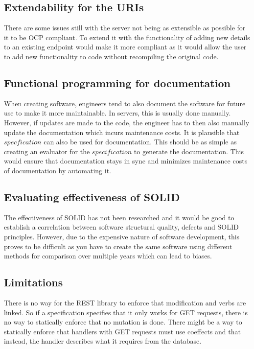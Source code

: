 \subsection{Extendability for the URIs}

There are some issues still with the server not being as extensible as possible
for it to be OCP compliant. To extend it with the functionality of adding new
details to an existing endpoint would make it more compliant as it would allow
the user to add new functionality to code without recompiling the original
code. 

\subsection{Functional programming for documentation}

When creating software, engineers tend to also document the software for future
use to make it more maintainable. In servers, this is usually done manually.
However, if updates are made to the code, the engineer has to then also
manually update the documentation which incurs maintenance costs. It is
plausible that $specfication$ can also be used for documentation. This should
be as simple as creating an evaluator for the $specification$ to generate the
documentation. This would ensure that documentation stays in sync and minimizes
maintenance costs of documentation by automating it.

\subsection{Evaluating effectiveness of SOLID}

The effectiveness of SOLID has not been researched and it would be good to
establish a correlation between software structural quality, defects and SOLID
principles. However, due to the expensive nature of software development, this
proves to be difficult as you have to create the same software using different
methods for comparison over multiple years which can lead to biases.

\subsection{Limitations}

There is no way for the REST library to enforce that modification and verbs are
linked. So if a specification specifies that it only works for GET requests,
there is no way to statically enforce that no mutation is done. There might be a
way to statically enforce that handlers with GET requests must use coeffects and
that instead, the handler describes what it requires from the
database.~\cite{gaboardi2016combining}


